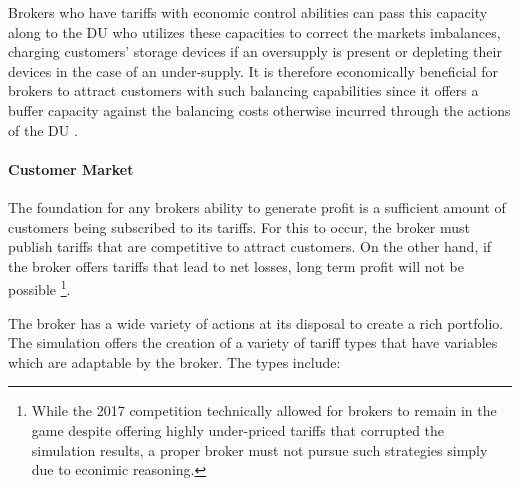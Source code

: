 Brokers who have tariffs with economic control abilities can pass this capacity along to the \ac{DU} who utilizes these
capacities to correct the markets imbalances, charging customers' storage devices if an oversupply is present or
depleting their devices in the case of an under-supply. It is therefore economically beneficial for brokers to attract
customers with such balancing capabilities since it offers a buffer capacity against the balancing costs otherwise
incurred through the actions of the \ac{DU} \citep[p.5]{ketter2018powertac} .

\paragraph{Customer Market}

The foundation for any brokers ability to generate profit is a sufficient amount of customers being subscribed to its tariffs. For
this to occur, the broker must publish tariffs that are competitive to attract customers. On the other hand, if the
broker offers tariffs that lead to net losses, long term profit will not be possible
\footnote{While the 2017
    competition technically allowed for brokers to remain in the game despite offering highly under-priced tariffs that
    corrupted the simulation results, a proper broker must not pursue such strategies simply due to econimic
reasoning.}.

The broker has a wide variety of actions at its disposal to create a rich portfolio. The simulation offers the
creation of a variety of tariff types that have variables which are adaptable by the broker. The types include:

